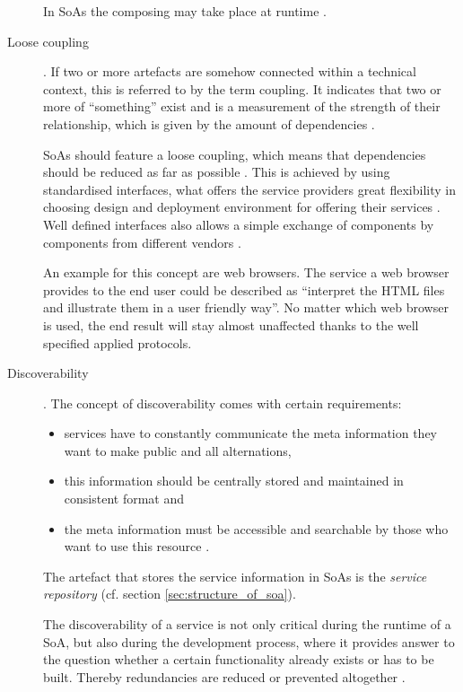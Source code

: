 \begin{description}
In SoAs the composing may take place at runtime \cite{breivold}.

\item [Loose coupling].
If two or more artefacts are somehow connected within a technical context, this is referred to by the term coupling. It indicates that two or more of ``something'' exist and is a measurement of the strength of their relationship, which is given by the amount of dependencies \cite{erl2008}.

SoAs should feature a loose coupling, which means that dependencies should be reduced as far as possible \cite{erl2008}. This is achieved by using standardised interfaces, what offers the service providers great flexibility in choosing design and deployment environment for offering their services \cite{breivold} \cite{arrowhead}. Well defined interfaces also allows a simple exchange of components by components from different vendors \cite{scholz}.

An example for this concept are web browsers. The service a web browser provides to the end user could be described as ``interpret the HTML files and illustrate them in a user friendly way''. No matter which web browser is used, the end result will stay almost unaffected thanks to the well specified applied protocols.

\item [Discoverability]. 
The concept of discoverability comes with certain requirements:
	\begin{itemize}
	\item services have to constantly communicate the meta information they want to make public and all alternations,
	\item this information should be centrally stored and maintained in consistent format and
	\item the meta information must be accessible and searchable by those who want to use this resource \cite[ch.12.]{erl2008}.
	\end{itemize}
The artefact that stores the service information in SoAs is the \emph{service repository} (cf. section \ref{sec:structure_of_soa}).

The discoverability of a service is not only critical during the runtime of a SoA, but also during the development process, where it provides answer to the question whether a certain functionality already exists or has to be built. Thereby redundancies are reduced or prevented altogether \cite[ch.12]{erl2008} \cite{arrowhead} \cite{breivold} \cite[p.27]{erl2011}.


\end{description}
